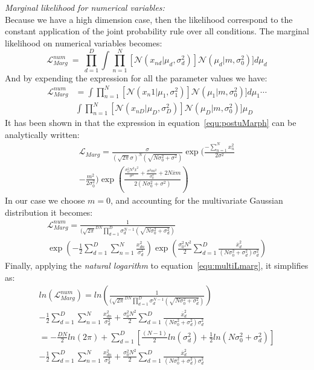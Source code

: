 \documentclass[twocolumn,12pt]{article}
\begin{document}
\emph{Marginal likelihood for numerical variables:}\\
Because we have a high dimension case, then the likelihood correspond to the constant application of the joint probability rule over all conditions.
The marginal likelihood on numerical variables becomes:
\begin{equation}
    \mathcal{L}_{Marg}^{num}\ =\ \prod_{d=1}^D\int\prod_{n=1}^N[\mathcal{N}(x_{nd}|\mu_d,\sigma_d^2)]\mathcal{N}(\mu_d|m,\sigma_0^2)]d\mu_d
\end{equation}
And by expending the expression for all the parameter values we have:
\begin{align}
    \mathcal{L}_{Marg}^{num} &= \int\prod_{n=1}^N[\mathcal{N}(x_n{1}|\mu_1,\sigma_1^2)]\mathcal{N}(\mu_1|m,\sigma_0^2)]d\mu_1\cdots \nonumber \\
    &\int\prod_{n=1}^N[\mathcal{N}(x_{nD}|\mu_D,\sigma_D^2)]\mathcal{N}(\mu_D|m,\sigma_0^2)]\mu_D
\end{align}
It has been shown in \cite{murphy} that the expression in equation~\ref{equ:postuMarph} can be analytically written:
\begin{align}
\mathcal{L}_{Marg} = \frac{\sigma}{(\sqrt{2\pi}\sigma)^N(\sqrt{N\sigma_0^2+\sigma^2})}\exp(\frac{-\sum_{n=1}^Nx_n^2}{2\sigma^2}\nonumber\\
    -\frac{m^2}{2\sigma_0^2})\exp(\frac{\frac{\sigma_0^2N^2\overline{x}^2}{\sigma^2}+\frac{\sigma^2m^2}{\sigma_0^2}+2N\overline{x}m}{2(N\sigma_0^2+\sigma^2)})
\end{align}
In our case we choose $m=0$, and accounting for the multivariate Gaussian distribution it becomes:
\begin{align}
\mathcal{L}_{Marg}^{num} = \frac{1}{(\sqrt{2\pi}^{DN}\prod_{d=1}^D\sigma_d^{N-1}(\sqrt{N\sigma_0^2+\sigma_d^2})}\nonumber\\
    \exp(-\frac{1}{2}\sum_{d=1}^D\sum_{n=1}^N\frac{x_{dn}^2}{\sigma_d^2})\exp(\frac{\sigma_0^2N^2}{2}\sum_{d=1}^D\frac{\overline{x}_d^2}{(N\sigma_0^2+\sigma_d^2)\sigma_d^2})
    \label{equ:multiLmarg}
\end{align}
Finally, applying the \emph{natural logarithm} to equation~\ref{equ:multiLmarg}, it simplifies as:
\small{
\begin{align}\label{equ:lnLikeNum}
ln(\mathcal{L}_{Marg}^{num})= ln(\frac{1}{(\sqrt{2\pi}^{DN}\prod_{d=1}^D\sigma_d^{N-1}(\sqrt{N\sigma_0^2+\sigma_d^2})})\nonumber \\
-\frac{1}{2}\sum_{d=1}^D\sum_{n=1}^N\frac{x_{dn}^2}{\sigma_d^2}+\frac{\sigma_0^2N^2}{2}\sum_{d=1}^D\frac{\overline{x}_d^2}{(N\sigma_0^2+\sigma_d^2)\sigma_d^2}\nonumber\\
= -\frac{DN}{2}ln(2\pi)+\sum_{d=1}^D[\frac{(N-1)}{2}ln(\sigma_d^2)+\frac{1}{2}ln(N\sigma_0^2+\sigma_d^2)]\nonumber\\
-\frac{1}{2}\sum_{d=1}^D\sum_{n=1}^N\frac{x_{dn}^2}{\sigma_d^2}+\frac{\sigma_0^2N^2}{2}\sum_{d=1}^D\frac{\overline{x}_d^2}{(N\sigma_0^2+\sigma_d^2)\sigma_d^2}
\end{align}
}
\end{document}
